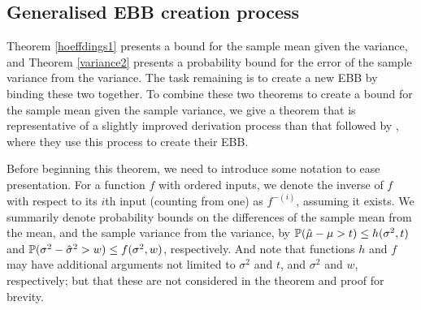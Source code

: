 \subsection{Generalised EBB creation process}\label{subsection:general_ebb_creation}

Theorem \ref{hoeffdings1} presents a bound for the sample mean given the variance, and Theorem \ref{variance2} presents a probability bound for the error of the sample variance from the variance. The task remaining is to create a new EBB by binding these two together.
To combine these two theorems to create a bound for the sample mean given the sample variance, we give a theorem that is representative of a slightly improved derivation process than that followed by \cite{Maurer50empiricalbernstein}, where they use this process to create their EBB.

Before beginning this theorem, we need to introduce some notation to ease presentation.
For a function $f$ with ordered inputs, we denote the inverse of $f$ with respect to its $i${th} input (counting from one) as $f^{-(i)}$, assuming it exists.
We summarily denote probability bounds on the differences of the sample mean from the mean, and the sample variance from the variance, by
$\operatorname{\mathbb{P}}(\hat{\mu}-\mu>t)\le h(\sigma^2,t)$ and $\operatorname{\mathbb{P}}(\sigma^2-\hat{\sigma}^2>w)\le f(\sigma^2,w)$, respectively.
And note that functions $h$ and $f$ may have additional arguments not limited to $\sigma^2$ and $t$, and $\sigma^2$ and $w$, respectively; but that these are not considered in the theorem and proof for brevity.

